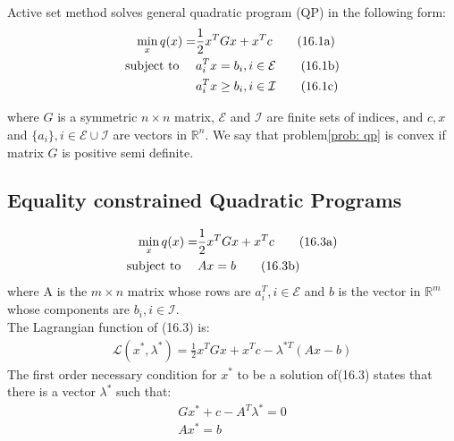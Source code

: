     Active set method solves general quadratic program (QP) in the following form:
    \begin{subequations}
        \label{prob: qp}
        \begin{align}
            \min_x q(x) = &\frac{1}{2} x^TGx + x^Tc \tag{16.1a}   \label{exp: qp_obj} \\
            \text{subject to \quad}  &a_i^Tx = b_i, i \in \mathcal{E} \tag{16.1b} \label{con: equality} \\
            &a_i^Tx \geq b_i, i \in \mathcal{I}  \tag{16.1c} \label{con: inequality}
        \end{align}
    \end{subequations}


    where $G$ is a symmetric $n\times n$ matrix, $\mathcal{E}$ and $\mathcal{I}$ are finite sets of indices, and $c, x$ and
    $\{a_i\}, i\in\mathcal{E}\cup\mathcal{I}$ are vectors in $\mathbb{R}^n$.
    We say that problem\eqref{prob: qp} is convex if matrix $G$ is positive semi definite.

    \subsection{Equality constrained Quadratic Programs} \label{subsec:-ec_qp}
    \begin{subequations}
        \label{prob: ec_qp}
        \begin{align}
            \min_x q(x) = &\frac{1}{2} x^TGx + x^Tc \tag{16.3a}   \label{exp: ec_qp_obj} \\
            \text{subject to \quad}  &Ax = b \tag{16.3b} \label{con: ec_qp}
        \end{align}
    \end{subequations}
    where A is the $m\times n$ matrix whose rows are $a_i^T, i\in\mathcal{E}$ and $b$ is the vector in $\mathbb{R}^m$
    whose components are $b_i, i\in\mathcal{I}$.\\
    The Lagrangian function of (16.3) is:
    \begin{align*}
        \mathcal{L}(x^*, \lambda^*) = \frac{1}{2} x^TGx + x^Tc - \lambda^{*T}(Ax - b)
    \end{align*}
    The first order necessary condition for $x^*$ to be a solution of(16.3) states that there is a vector $\lambda^*$
    such that:
    \begin{align*}
        Gx^* + c - A^T\lambda^* = 0\\
        Ax^* = b
    \end{align*}

